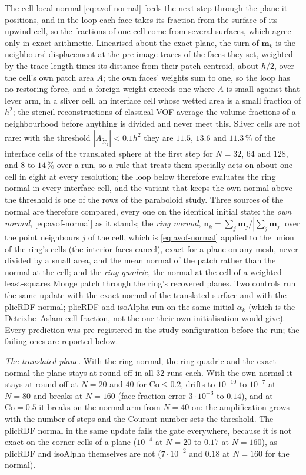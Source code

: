 \documentclass[preprint,12pt]{elsarticle}
\begin{document}
The cell-local normal \cref{eq:avof-normal} feeds the next step through the plane it positions, and in the loop each face takes its fraction from the surface of its upwind cell, so the fractions of one cell come from several surfaces, which agree only in exact arithmetic. Linearised about the exact plane, the turn of $\mathbf{m}_k$ is the neighbours' displacement at the pre-image traces of the faces they set, weighted by the trace length times its distance from their patch centroid, about $h/2$, over the cell's own patch area $A$; the own faces' weights sum to one, so the loop has no restoring force, and a foreign weight exceeds one where $A$ is small against that lever arm, in a sliver cell, an interface cell whose wetted area is a small fraction of $h^2$; the stencil reconstructions of classical VOF average the volume fractions of a neighbourhood before anything is divided and never meet this. Sliver cells are not rare: with the threshold $|A_{\tilde\Sigma_k}| < 0.1 h^2$ they are $11.5$, $13.6$ and $11.3\,\%$ of the interface cells of the translated sphere at the first step for $N = 32$, $64$ and $128$, and $8$ to $14\,\%$ over a run, so a rule that treats them specially acts on about one cell in eight at every resolution; the loop below therefore evaluates the ring normal in every interface cell, and the variant that keeps the own normal above the threshold is one of the rows of the paraboloid study. Three sources of the normal are therefore compared, every one on the identical initial state: the \emph{own normal}, \cref{eq:avof-normal} as it stands; the \emph{ring normal}, $\mathbf{n}_k = \sum_j \mathbf{m}_j / |\sum_j \mathbf{m}_j|$ over the point neighbours $j$ of the cell, which is \cref{eq:avof-normal} applied to the union of the ring's cells (the interior faces cancel), exact for a plane on any mesh, never divided by a small area, and the mean normal of the patch rather than the normal at the cell; and the \emph{ring quadric}, the normal at the cell of a weighted least-squares Monge patch through the ring's recovered planes. Two controls run the same update with the exact normal of the translated surface and with the plicRDF normal; plicRDF and isoAlpha run on the same initial $\alpha_k$ (which is the Detrixhe--Aslam cell fraction, not the one their own initialisation would give). Every prediction was pre-registered in the study configuration before the run; the failing ones are reported below.

\emph{The translated plane.} With the ring normal, the ring quadric and the exact normal the plane stays at round-off in all 32 runs each. With the own normal it stays at round-off at $N = 20$ and $40$ for $\mathrm{Co} \le 0.2$, drifts to $10^{-10}$ to $10^{-7}$ at $N = 80$ and breaks at $N = 160$ (face-fraction error $3\cdot10^{-3}$ to $0.14$), and at $\mathrm{Co} = 0.5$ it breaks on the normal arm from $N = 40$ on: the amplification grows with the number of steps and the Courant number sets the threshold. The plicRDF normal in the same update fails the gate everywhere, because it is not exact on the corner cells of a plane ($10^{-4}$ at $N = 20$ to $0.17$ at $N = 160$), as plicRDF and isoAlpha themselves are not ($7\cdot10^{-2}$ and $0.18$ at $N = 160$ for the normal).
\end{document}
